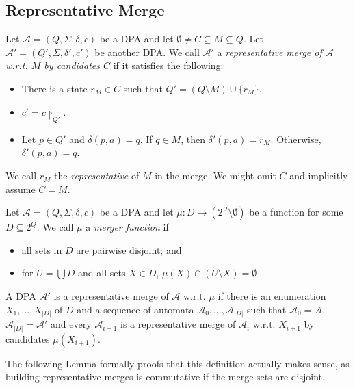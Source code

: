 \subsection{Representative Merge}

\begin{defn}
	Let $\mathcal{A} = (Q, \Sigma, \delta, c)$ be a DPA and let $\emptyset \neq C \subseteq M \subseteq Q$. Let $\mathcal{A}' = (Q', \Sigma, \delta', c')$ be another DPA. We call $\mathcal{A}'$ a \emph{representative merge of $\mathcal{A}$ w.r.t. $M$ by candidates $C$} if it satisfies the following:
	\begin{itemize}
		\item There is a state $r_M \in C$ such that $Q' = (Q \setminus M) \cup \{r_M\}$.
		\item $c' = c\upharpoonright_{Q'}$.
		\item Let $p \in Q'$ and $\delta(p, a) = q$. If $q \in M $, then $\delta'(p, a) = r_M$. Otherwise, $\delta'(p, a) = q$. 
	\end{itemize}
	
	We call $r_M$ the \emph{representative} of $M$ in the merge. We might omit $C$ and implicitly assume $C = M$.
\end{defn}

\begin{defn}
	Let $\mathcal{A} = (Q, \Sigma, \delta, c)$ be a DPA and let $\mu : D \rightarrow (2^\mathcal{Q} \setminus \emptyset)$ be a function for some $D \subseteq 2^Q$. We call $\mu$ a \emph{merger function} if 
	\begin{itemize}
		\item all sets in $D$ are pairwise disjoint; and
		\item for $U = \bigcup D$ and all sets $X \in D$, $\mu(X) \cap (U \setminus X) = \emptyset$
	\end{itemize}
	
	A DPA $\mathcal{A}'$ is a representative merge of $\mathcal{A}$ w.r.t. $\mu$ if there is an enumeration $X_1, \dots, X_{|D|}$ of $D$ and a sequence of automata $\mathcal{A}_0, \dots, \mathcal{A}_{|D|}$ such that $\mathcal{A}_0 = \mathcal{A}$, $\mathcal{A}_{|D|} = \mathcal{A}'$ and every $\mathcal{A}_{i+1}$ is a representative merge of $\mathcal{A}_i$ w.r.t. $X_{i+1}$ by candidates $\mu(X_{i+1})$.
\end{defn}

\vspace{5pt}

The following Lemma formally proofs that this definition actually makes sense, as building representative merges is commutative if the merge sets are disjoint.

